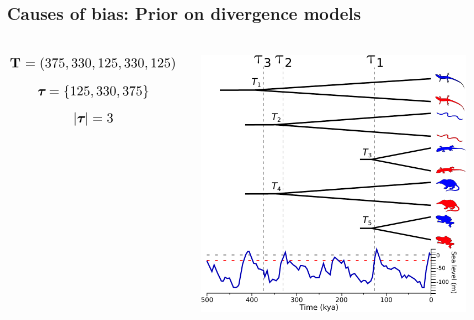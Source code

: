 \begin{frame}
    \frametitle{Causes of bias: Prior on divergence models}
    \begin{columns}[c]
            \begin{displaybox}[4.5cm]
                {\small
                \[
                    \mathbf{T_{}} = (375,330,125,330,125)
                \]\vspace{0mm}
                }
                \[
                    \boldsymbol{\tau_{}} = \{125,330,375\}
                \]\vspace{0mm}
                \[
                    \lvert \boldsymbol{\tau_{}} \rvert = 3
                \]\vspace{0mm}
            \end{displaybox}
            \includegraphics[height=6.8cm]{images/sea-level-prediction-trees-labels-compact-alt2.pdf}
    \end{columns}
\end{frame}

